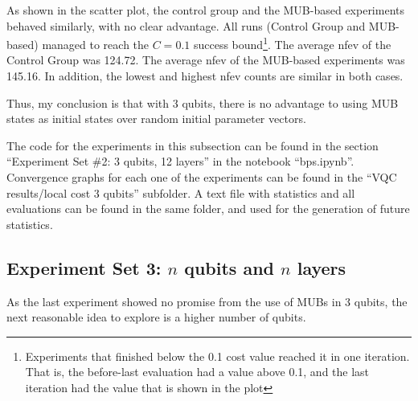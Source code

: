 \documentclass[a4paper,12pt]{article}
\begin{document}
As shown in the scatter plot, the control group and the MUB-based experiments behaved similarly, with no clear advantage.
All runs (Control Group and MUB-based) managed to reach the $C=0.1$ success bound\footnote{Experiments that finished below the 0.1 cost value reached it in one iteration. That is, the before-last evaluation had a value above 0.1, and the last iteration had the value that is shown in the plot}.
The average nfev of the Control Group was 124.72.
The average nfev of the MUB-based experiments was 145.16.
In addition, the lowest and highest nfev counts are similar in both cases.

Thus, my conclusion is that with 3 qubits, there is no advantage to using MUB states as initial states over random initial parameter vectors.

The code for the experiments in this subsection can be found in the section ``Experiment Set \#2: 3 qubits, 12 layers'' in the notebook ``bps.ipynb''.
Convergence graphs for each one of the experiments can be found in the ``VQC results/local cost 3 qubits'' subfolder. A text file with statistics and all evaluations can be found in the same folder, and used for the generation of future statistics.



\subsection{Experiment Set 3: $n$ qubits and $n$ layers} \label{subsec:nqubits}
As the last experiment showed no promise from the use of MUBs in 3 qubits, the next reasonable idea to explore is a higher number of qubits.
\end{document}
